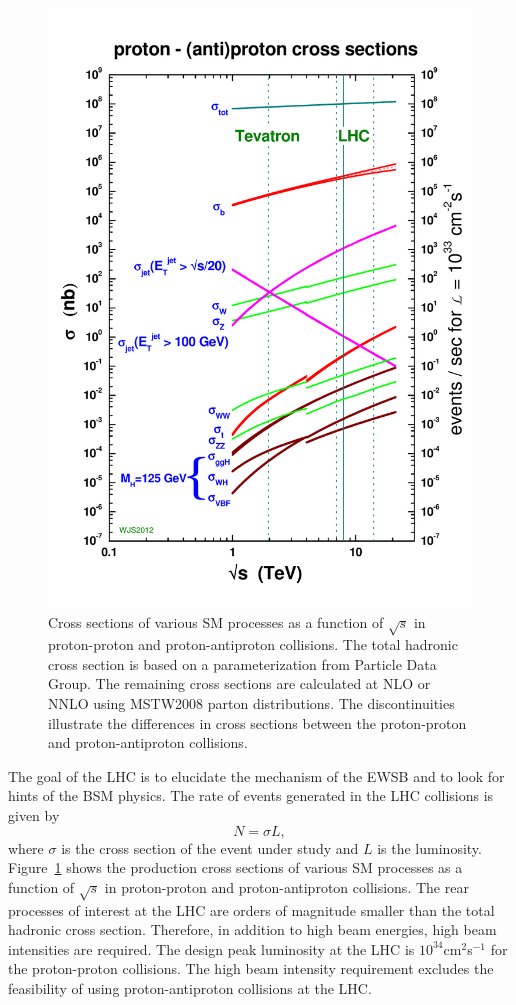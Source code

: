 \begin{figure}[h]
\centering
\includegraphics[width=0.60\columnwidth]{figures_chapter2/crosssections2013}
\caption{Cross sections of various SM processes as a function of $\sqrt{s}$ in proton-proton and proton-antiproton collisions\cite{sterling}. The total hadronic cross section is based on a parameterization from Particle Data Group\cite{Agashe:2014kda}. The remaining cross sections are calculated at NLO or NNLO using MSTW2008 parton distributions\cite{MSTW}. The discontinuities illustrate the differences in cross sections between the proton-proton and proton-antiproton collisions.}
\label{fig:xsec}
\end{figure}

The goal of the LHC is to elucidate the mechanism of the EWSB and to look for hints of the BSM physics. The rate of events generated in the LHC collisions is given by 
\begin{equation} \label{eq:lumi}
N = \sigma L,
\end{equation}
where $\sigma$ is the cross section of the event under study and $L$ is the luminosity. Figure~\ref{fig:xsec} shows the production cross sections of various SM processes as a function of $\sqrt{s}$ in proton-proton and proton-antiproton collisions. The rear processes of interest at the LHC are orders of magnitude smaller than the total hadronic cross section. Therefore, in addition to high beam energies, high beam intensities are required. The design peak luminosity at the LHC is $10^{34}$cm$^2$s$^{-1}$ for the proton-proton collisions. The high beam intensity requirement excludes the feasibility of using proton-antiproton collisions at the LHC. 


